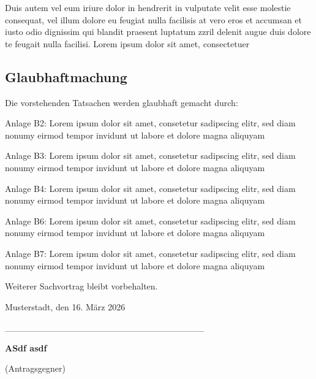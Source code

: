 \documentclass[
  12pt,
  a4paper,
]{article}
\begin{document}
Duis autem vel eum iriure dolor in hendrerit in vulputate velit esse
molestie consequat, vel illum dolore eu feugiat nulla facilisis at vero
eros et accumsan et iusto odio dignissim qui blandit praesent luptatum
zzril delenit augue duis dolore te feugait nulla facilisi. Lorem ipsum
dolor sit amet, consectetuer

\subsection{Glaubhaftmachung}\label{glaubhaftmachung}

Die vorstehenden Tatsachen werden glaubhaft gemacht durch:

Anlage B2: Lorem ipsum dolor sit amet, consetetur sadipscing elitr, sed
diam nonumy eirmod tempor invidunt ut labore et dolore magna aliquyam

Anlage B3: Lorem ipsum dolor sit amet, consetetur sadipscing elitr, sed
diam nonumy eirmod tempor invidunt ut labore et dolore magna aliquyam

Anlage B4: Lorem ipsum dolor sit amet, consetetur sadipscing elitr, sed
diam nonumy eirmod tempor invidunt ut labore et dolore magna aliquyam

Anlage B6: Lorem ipsum dolor sit amet, consetetur sadipscing elitr, sed
diam nonumy eirmod tempor invidunt ut labore et dolore magna aliquyam

Anlage B7: Lorem ipsum dolor sit amet, consetetur sadipscing elitr, sed
diam nonumy eirmod tempor invidunt ut labore et dolore magna aliquyam

\vspace{12pt}
\needspace{7cm}

Weiterer Sachvortrag bleibt vorbehalten.

\vspace{10pt}

Musterstadt, den 16. März 2026

\_\_\_\_\_\_\_\_\_\_\_\_\_\_\_\_\_\_\_\_\_\_\_\_\_\_\_\_\_\_\_

\textbf{ASdf asdf}

(Antragsgegner)
\end{document}
